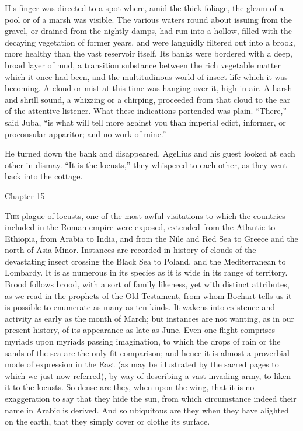 His finger was directed to a spot where, amid the thick foliage,
the gleam of a pool or of a marsh was visible. The various waters
round about issuing from the gravel, or drained from the nightly
damps, had run into a hollow, filled with the decaying vegetation of
former years, and were languidly filtered out into a brook, more
healthy than the vast reservoir itself. Its banks were bordered with a
deep, broad layer of mud, a transition substance between the rich
vegetable matter which it once had been, and the multitudinous world
of insect life which it was becoming. A cloud or mist at this time was
hanging over it, high in air. A harsh and shrill sound, a whizzing or
a chirping, proceeded from that cloud to the ear of the attentive
listener. What these indications portended was plain.
``There,'' said Juba, ``is what will tell more against you
than imperial edict, informer, or proconsular apparitor; and no work
of mine.''

He turned down the bank and disappeared. Agellius and his guest
looked at each other in dismay. ``It is the locusts,'' they
whispered to each other, as they went back into the cottage.

Chapter 15


T\textsc{he} plague of locusts, one of the most awful visitations to
which the countries included in the Roman empire were exposed,
extended from the Atlantic to Ethiopia, from Arabia to India, and from
the Nile and Red Sea to Greece and the north of Asia Minor. Instances
are recorded in history of clouds of the devastating insect crossing
the Black Sea to Poland, and the Mediterranean to Lombardy. It is as
numerous in its species as it is wide in its range of territory. Brood
follows brood, with a sort of family likeness, yet with distinct
attributes, as we read in the prophets of the Old Testament, from whom
Bochart tells us it is possible to enumerate as many as ten kinds. It
wakens into existence and activity as early as the month of March; but
instances are not wanting, as in our present history, of its
appearance as late as June. Even one flight comprises myriads upon
myriads passing imagination, to which the drops of rain or the sands
of the sea are the only fit comparison; and hence it is almost a
proverbial mode of expression in the East (as may be illustrated by the sacred pages to which we just now referred), by way of
describing a vast invading army, to liken it to the locusts. So dense
are they, when upon the wing, that it is no exaggeration to say that
they hide the sun, from which circumstance indeed their name in Arabic
is derived. And so ubiquitous are they when they have alighted on the
earth, that they simply cover or clothe its surface.

